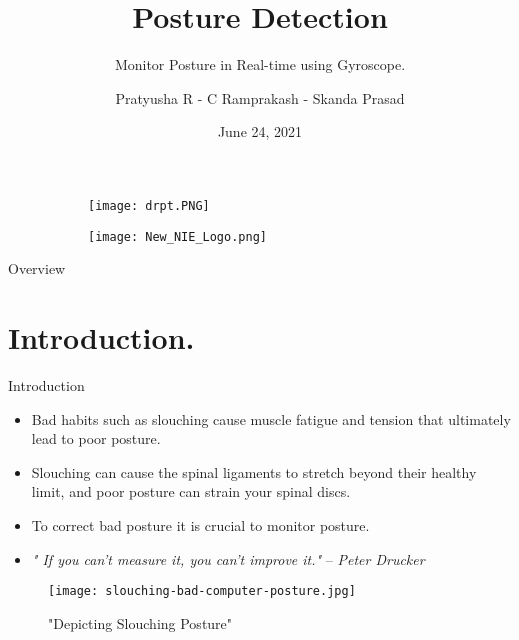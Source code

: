 \documentclass[aspectratio=169,xcolor=dvipsnames]{beamer}
\title[short title]{Posture Detection}
\subtitle{Monitor Posture in Real-time using Gyroscope.}
\author[Pin-Yen]{Pratyusha R - C Ramprakash - Skanda Prasad}
\institute %
{
    Department of Electronics and Communication Engineering

    6th Semester, A Section 
    \vskip 3pt
}
\date{June 24, 2021} %
\begin{document}
\begin{frame}
    \begin{figure}
     \centering
     \begin{subfigure}[b]{0.49\textwidth}
         \centering
         \texttt{[image: drpt.PNG]}
     \end{subfigure}
     \hfill
     \begin{subfigure}[b]{0.49\textwidth}
         \centering
         \texttt{[image: New\_NIE\_Logo.png]}
     \end{subfigure}
     \end{figure}
    \titlepage
\end{frame}

\begin{frame}{Overview}
    \tableofcontents
\end{frame}

\section{Introduction.}

\begin{frame}{Introduction}
        \vspace{0.5cm}
        \begin{itemize}
        \item Bad habits such as slouching cause muscle fatigue and tension that ultimately lead to poor posture.
        \item Slouching can cause the spinal ligaments to stretch beyond their healthy limit, and poor posture can strain your spinal discs. 
        \item To correct bad posture it is crucial to monitor posture. 
        \item \textit{" If you can’t measure it, you can’t improve it."} –\textit{ Peter Drucker}
    \end{itemize}
    \hfill
     \begin{figure}
        \centering
        \texttt{[image: slouching-bad-computer-posture.jpg]}        
        \caption{"Depicting Slouching Posture"}
        \label{fig:good}
    \end{figure}
\end{frame}

\end{document}

